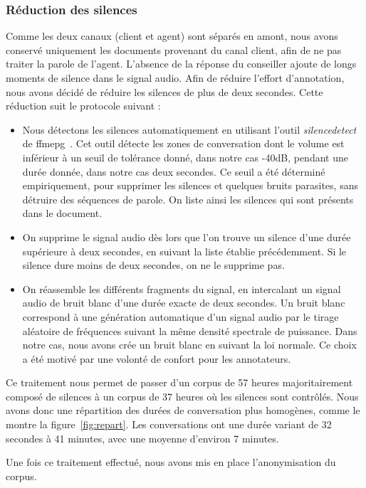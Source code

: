 \subsubsection{Réduction des silences}
Comme les deux canaux (client et agent) sont séparés en amont, nous avons conservé uniquement les documents provenant du canal client, afin de ne pas traiter la parole de l'agent.
L'absence de la réponse du conseiller ajoute de longs moments de silence dans le signal audio. Afin de réduire l'effort d'annotation, nous avons décidé de réduire les silences de plus de deux secondes. Cette réduction suit le protocole suivant :
\begin{itemize}
  \item Nous détectons les silences automatiquement en utilisant l'outil \textit{silencedetect} de ffmepg~\cite{Tomar2006}. Cet outil détecte les zones de conversation dont le volume est inférieur à un seuil de tolérance donné, dans notre cas -40dB, pendant une durée donnée, dans notre cas deux secondes. Ce seuil a été déterminé empiriquement, pour supprimer les silences et quelques bruits parasites, sans détruire des séquences de parole. On liste ainsi les silences qui sont présents dans le document.
  \item On supprime le signal audio dès lors que l'on trouve un silence d'une durée supérieure à deux secondes, en suivant la liste établie précédemment. Si le silence dure moins de deux secondes, on ne le supprime pas.
  \item On réassemble les différents fragments du signal, en intercalant un signal audio de bruit blanc d'une durée exacte de deux secondes. Un bruit blanc correspond à une génération automatique d'un signal audio par le tirage aléatoire de fréquences suivant la même densité spectrale de puissance. Dans notre cas, nous avons crée un bruit blanc en suivant la loi normale. Ce choix a été motivé par une volonté de confort pour les annotateurs.
\end{itemize}



Ce traitement nous permet de passer d'un corpus de 57 heures majoritairement composé de silences à un corpus de 37 heures où les silences sont contrôlés. Nous avons donc une répartition des durées de conversation plus homogènes, comme le montre la figure~\ref{fig:repart}. Les conversations ont une durée variant de 32 secondes à 41 minutes, avec une moyenne d'environ 7 minutes.

Une fois ce traitement effectué, nous avons mis en place l'anonymisation du corpus.


